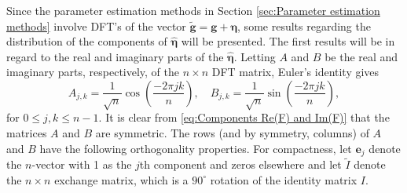 \documentclass[12pt]{article}
\newcommand{\gVec}{\mathbf{g}}	%
\newcommand{\gnoiseVec}{\widetilde{\mathbf{g}}}	%
\newcommand{\noise}{\eta}	%
\newcommand{\noiseVec}{\bm{\noise}}	%
\begin{document}
Since the parameter estimation methods in Section \ref{sec:Parameter estimation methods} involve DFT's of the vector $\gnoiseVec = \gVec + \noiseVec$, some results regarding the distribution of the components of $\widehat{\noiseVec}$ will be presented. The first results will be in regard to the real and imaginary parts of the $\widehat{\noiseVec}$. Letting $A$ and $B$ be the real and imaginary parts, respectively, of the $n \times n$ DFT matrix, Euler's identity gives
\begin{equation}
A_{j,k} = \frac{1}{\sqrt{n}}\cos\left(\frac{-2\pi{jk}}{n}\right), \quad B_{j,k} = \frac{1}{\sqrt{n}}\sin\left(\frac{-2\pi{jk}}{n}\right),
\label{eq:Components Re(F) and Im(F)}
\end{equation}
for $0 \leq j,k \leq n-1$. It is clear from \eqref{eq:Components Re(F) and Im(F)} that the matrices $A$ and $B$ are symmetric. The rows (and by symmetry, columns) of $A$ and $B$ have the following orthogonality properties. For compactness, let $\mathbf{e}_j$ denote the $n$-vector with 1 as the $j$th component and zeros elsewhere and let $\tilde{I}$ denote the $n \times n$ exchange matrix, which is a $90^\circ$ rotation of the identity matrix $I$.
\end{document}
